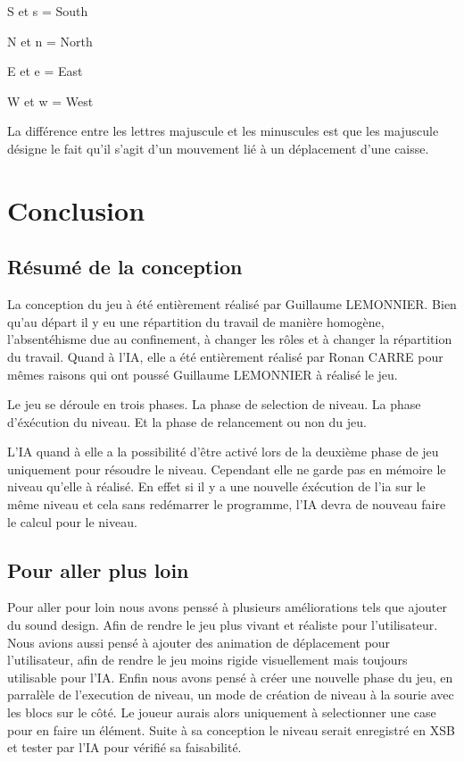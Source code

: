\documentclass[a4paper,12pt]{article} %
\begin{document}
S et s = South

N et n = North

E et e = East

W et w = West

La différence entre les lettres majuscule et les minuscules est que les majuscule désigne le fait qu'il s'agit d'un mouvement lié à un déplacement d'une caisse.

\newpage

\section{Conclusion}

\subsection{Résumé de la conception}

La conception du jeu à été entièrement réalisé par Guillaume LEMONNIER.
Bien qu'au départ il y eu une répartition du travail de manière homogène, l'absentéhisme due au confinement, à changer les rôles et à changer la répartition du travail.
Quand à l'IA, elle a été entièrement réalisé par Ronan CARRE pour mêmes raisons qui ont poussé Guillaume LEMONNIER à réalisé le jeu.

Le jeu se déroule en trois phases.
La phase de selection de niveau.
La phase d'éxécution du niveau.
Et la phase de relancement ou non du jeu.

L'IA quand à elle a la possibilité d'être activé lors de la deuxième phase de jeu uniquement pour résoudre le niveau.
Cependant elle ne garde pas en mémoire le niveau qu'elle à réalisé.
En effet si il y a une nouvelle éxécution de l'ia sur le même niveau et cela sans redémarrer le programme, l'IA devra de nouveau faire le calcul pour le niveau.

\subsection{Pour aller plus loin}

Pour aller pour loin nous avons penssé à plusieurs améliorations tels que ajouter du sound design.
Afin de rendre le jeu plus vivant et réaliste pour l'utilisateur.
Nous avions aussi pensé à ajouter des animation de déplacement pour l'utilisateur, afin de rendre le jeu moins rigide visuellement mais toujours utilisable pour l'IA.
Enfin nous avons pensé à créer une nouvelle phase du jeu, en parralèle de l'execution de niveau, un mode de création de niveau à la sourie avec les blocs sur le côté.
Le joueur aurais alors uniquement à selectionner une case pour en faire un élément.
Suite à sa conception le niveau serait enregistré en XSB et tester par l'IA pour vérifié sa faisabilité.
\end{document}
